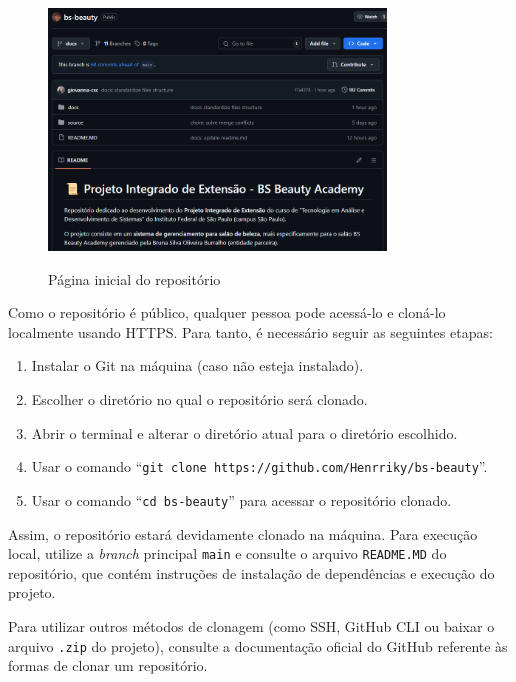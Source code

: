 \begin{figure}[h]
	\centering
	\caption{Página inicial do repositório}
	\includegraphics[width=0.8\textwidth]{cap03-gestao/imagens/bsbeauty-repositorio.png}
	\label{fig:inicio-repositorio}
\end{figure}

Como o repositório é público, qualquer pessoa pode acessá-lo e cloná-lo localmente usando HTTPS. Para tanto, é necessário seguir as seguintes etapas:
 
\begin{enumerate}
	\item Instalar o Git na máquina (caso não esteja instalado).
	\item Escolher o diretório no qual o repositório será clonado.
	\item Abrir o terminal e alterar o diretório atual para o diretório escolhido.
	\item Usar o comando ``\texttt{git clone https://github.com/Henrriky/bs-beauty}''.
	\item Usar o comando ``\texttt{cd bs-beauty}'' para acessar o repositório clonado.
\end{enumerate}

Assim, o repositório estará devidamente clonado na máquina. Para execução local, utilize a \textit{branch} principal \texttt{main} e consulte o arquivo \texttt{README.MD} do repositório, que contém instruções de instalação de dependências e execução do projeto.

Para utilizar outros métodos de clonagem (como SSH, GitHub CLI ou baixar o arquivo \texttt{.zip} do projeto), consulte a documentação oficial do GitHub \cite{clone-2025} referente às formas de clonar um repositório.